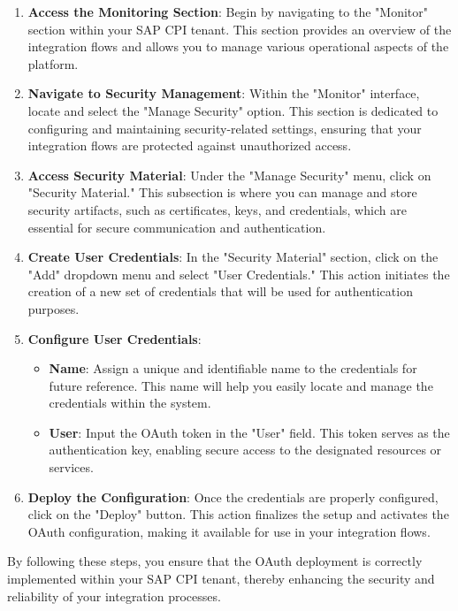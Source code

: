 \begin{enumerate}
    \item \textbf{Access the Monitoring Section}: Begin by navigating to the "Monitor" section within your SAP CPI tenant. This section provides an overview of the integration flows and allows you to manage various operational aspects of the platform.

    \item \textbf{Navigate to Security Management}: Within the "Monitor" interface, locate and select the "Manage Security" option. This section is dedicated to configuring and maintaining security-related settings, ensuring that your integration flows are protected against unauthorized access.

    \item \textbf{Access Security Material}: Under the "Manage Security" menu, click on "Security Material." This subsection is where you can manage and store security artifacts, such as certificates, keys, and credentials, which are essential for secure communication and authentication.

    \item \textbf{Create User Credentials}: In the "Security Material" section, click on the "Add" dropdown menu and select "User Credentials." This action initiates the creation of a new set of credentials that will be used for authentication purposes.

    \item \textbf{Configure User Credentials}:
    \begin{itemize}
        \item \textbf{Name}: Assign a unique and identifiable name to the credentials for future reference. This name will help you easily locate and manage the credentials within the system.
        \item \textbf{User}: Input the OAuth token in the "User" field. This token serves as the authentication key, enabling secure access to the designated resources or services.
    \end{itemize}

    \item \textbf{Deploy the Configuration}: Once the credentials are properly configured, click on the "Deploy" button. This action finalizes the setup and activates the OAuth configuration, making it available for use in your integration flows.
\end{enumerate}

By following these steps, you ensure that the OAuth deployment is correctly implemented within your SAP CPI tenant, thereby enhancing the security and reliability of your integration processes.


